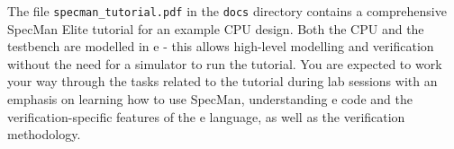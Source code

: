 \documentclass[a4paper,11pt]{article}
\begin{document}
\smallskip
{}
\smallskip The file \verb#specman_tutorial.pdf# in the \verb#docs# directory
contains a comprehensive SpecMan Elite tutorial for an example CPU design. Both
the CPU and the testbench are modelled in e - this allows high-level modelling
and verification without the need for a simulator to run the tutorial. You are
expected to work your way through the tasks related to the tutorial during lab
sessions with an emphasis on learning how to use SpecMan, understanding e code
and the verification-specific features of the e language, as well as the
verification methodology.
\end{document}
